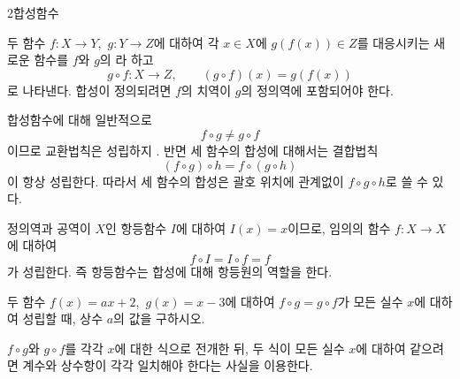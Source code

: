 \documentclass[10pt]{article}
\begin{document}
\begin{dmconcept}{2}{합성함수}
\setlength{\parskip}{1.6mm plus 1.7mm minus 0mm}\linespread{1.23}\selectfont%


두 함수 $f : X \to Y$,\ $g : Y \to Z$에 대하여 각 $x \in X$에 $g(f(x)) \in Z$를 대응시키는 새로운 함수를 $f$와 $g$의 라 하고
\begin{equation*}
  g \circ f : X \to Z, \qquad (g \circ f)(x) = g(f(x))
\end{equation*}
로 나타낸다. 합성이 정의되려면 $f$의 치역이 $g$의 정의역에 포함되어야 한다.


합성함수에 대해 일반적으로
\begin{equation*}
  f \circ g \ne g \circ f
\end{equation*}
이므로 교환법칙은 성립하지 . 반면 세 함수의 합성에 대해서는 결합법칙
\begin{equation*}
  (f \circ g) \circ h = f \circ (g \circ h)
\end{equation*}
이 항상 성립한다. 따라서 세 함수의 합성은 괄호 위치에 관계없이 $f \circ g \circ h$로 쓸 수 있다.


정의역과 공역이 $X$인 항등함수 $I$에 대하여 $I(x) = x$이므로, 임의의 함수 $f : X \to X$에 대하여
\begin{equation*}
  f \circ I = I \circ f = f
\end{equation*}
가 성립한다. 즉 항등함수는 합성에 대해 항등원의 역할을 한다.

\end{dmconcept}

\newpage


\begin{dmproblem}
두 함수 $f(x) = ax + 2$,\ $g(x) = x - 3$에 대하여 $f \circ g = g \circ f$가 모든 실수 $x$에 대하여 성립할 때, 상수 $a$의 값을 구하시오.
\end{dmproblem}

\begin{dmapproach}
$f \circ g$와 $g \circ f$를 각각 $x$에 대한 식으로 전개한 뒤, 두 식이 모든 실수 $x$에 대하여 같으려면 계수와 상수항이 각각 일치해야 한다는 사실을 이용한다.
\end{dmapproach}
\end{document}
